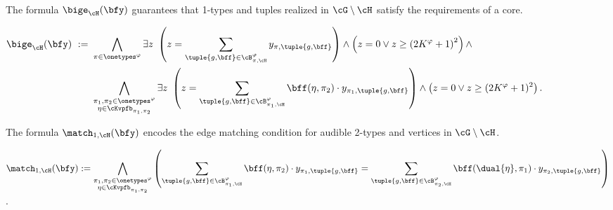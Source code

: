 \begin{compactitem}
    \item
    The formula $\bige_{\cH}(\bfy)$ guarantees that 1-types and tuples realized in $\cG \setminus \cH$ satisfy the requirements of a core. \\
    \begin{notsotiny}
    $
    \begin{aligned}
            \bige_{\cH}(\bfy)
        \ :=\ &
        \bigwedge_{\pi \in \onetypes^\varphi}
            \exists z\ 
            \left(
                z = \sum_{\tuple{g, \bff} \in \cB^\varphi_{\pi, \cH}} y_{\pi, \tuple{g, \bff}}
            \right) \land
            \left(
                z = 0  \lor
                z \ge {(2K^\varphi+1)}^2 
            \right)
        \land \\
        &\bigwedge_{\substack{
            \pi_1, \pi_2 \in \onetypes^\varphi \\ 
            \eta \in \cKvpfb_{\pi_1, \pi_2}}}
        \exists z\ 
        \left(z = \sum_{\tuple{g, \bff} \in \cB^\varphi_{\pi_1, \cH}} \bff(\eta, \pi_2) \cdot y_{\pi_1, \tuple{g, \bff}}\right) \land
        \left(
            z = 0 \lor
            z \ge (2K^\varphi+1)^2
            \right).
        \end{aligned}
    $
    \end{notsotiny}
    \item
        The formula $\match_{1, \cH}(\bfy)$ encodes the edge matching condition for audible 2-types and vertices in $\cG \setminus \cH$. \\
        \begin{notsotiny}
        $\displaystyle
        \match_{1, \cH}(\bfy)
         := 
        \bigwedge_{\substack{
            \pi_1, \pi_2 \in \onetypes^\varphi \\
            \eta \in \cKvpfb_{\pi_1, \pi_2}}}
        \left(
            \sum_{\tuple{g, \bff} \in \cB^{\varphi}_{\pi_1, \cH}} \bff(\eta, \pi_2) \cdot y_{\pi_1, \tuple{g, \bff}}
            =
            \sum_{\tuple{g, \bff} \in \cB^{\varphi}_{\pi_2, \cH}} \bff(\dual{\eta}, \pi_1) \cdot y_{\pi_2, \tuple{g, \bff}}
        \right)
        $.
        \end{notsotiny}


\end{compactitem}
